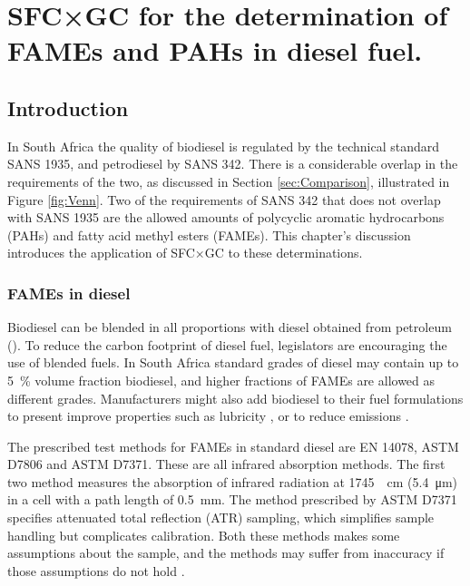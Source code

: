 
\begin{savequote}[\quotewidth]

\end{savequote}

\chapter{SFC×GC for the determination of FAMEs and PAHs in diesel fuel.} %
\label{Chapter7} %

\section{Introduction}

In South Africa the quality of biodiesel is regulated by the technical standard
SANS 1935, and petrodiesel by SANS 342. There is a considerable overlap in the
requirements of the two, as discussed in Section \ref{sec:Comparison},
illustrated in Figure \ref{fig:Venn}. Two of the requirements of SANS 342 that
does not overlap with SANS 1935 are the allowed amounts of polycyclic aromatic
hydrocarbons (PAHs) and fatty acid methyl esters (FAMEs). This chapter's
discussion introduces the application of SFC×GC to these determinations. 

\subsection{FAMEs in diesel}

Biodiesel can be blended in all proportions with diesel obtained from petroleum
(). To reduce the carbon footprint of diesel fuel,
legislators are encouraging the use of blended fuels. In South Africa standard
grades of diesel may contain up to \SI{5}{\percent} volume fraction biodiesel, 
and higher fractions of FAMEs are allowed as different grades. Manufacturers might
also add biodiesel to their fuel formulations to present improve properties such as
lubricity \autocite{Knothe2005}, or to reduce emissions \autocite{Wattrus2016}.

The prescribed test methods for FAMEs in standard diesel are EN 14078, ASTM
D7806 and ASTM D7371. These are all infrared absorption methods. The first two
method measures the absorption of infrared radiation at
\SI{1745}{\per\centi\metre} (\SI{5.4}{\micro\metre}) in a cell with a path
length of \SI{0.5}{\milli\metre}. The method prescribed by ASTM D7371
specifies attenuated total reflection (ATR) sampling, which simplifies sample
handling but complicates calibration. Both these methods makes some assumptions
about the sample, and the methods may suffer from inaccuracy if those assumptions
do not hold \autocite{Pinho2014}.

